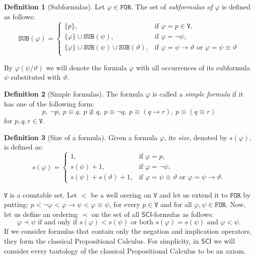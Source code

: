 \documentclass{article}
\theoremstyle{definition}
\newtheorem{definition}{Definition}[section]
\theoremstyle{definition}
\theoremstyle{definition}
\theoremstyle{definition}
\theoremstyle{definition}
\newcommand*{\id}{\equiv}
\newcommand*{\ra}{\rightarrow}
\newcommand*{\V}{\texttt{V}}
\newcommand*{\FOR}{\texttt{FOR}}
\newcommand*{\SUB}{\texttt{SUB}}
\newcommand{\SCI}{$\mathsf{SCI}$\xspace}
\begin{document}
\begin{definition}[Subformulas]
    Let $\varphi \in \FOR$. The set of \emph{subformulas of $\varphi$} is defined as follows:
    $$
        \SUB(\varphi) = \begin{cases}
            \{p\},                                            & \text{if } \varphi = p \in \V,                                                   \\
            \{\varphi\} \cup \SUB(\psi),                      & \text{if } \varphi = \lnot \psi,                                                 \\
            \{\varphi\} \cup \SUB(\psi) \cup \SUB(\vartheta), & \text{if } \varphi = \psi \ra \vartheta \text{ or } \varphi = \psi \id \vartheta \\
        \end{cases}
    $$
\end{definition}
By $\varphi(\psi / \vartheta)$ we will denote the formula $\varphi$ with all
occurrences of its subformula $\psi$ substituted with $\vartheta$.

\begin{definition}[Simple formulas]
    The formula $\varphi$ is called a \emph{simple formula} if it has one of the following form:
    $$
        p,\ \lnot p,\ p \id q,\ p \not \id q,\ p \id \lnot q,\ p \id (q \ra r),\ p \id (q \id r)
    $$
    for $p, q, r \in \V$.
\end{definition}

\begin{definition}[Size of a formula]
    Given a formula $\varphi$, its \emph{size}, denoted by $s(\varphi)$, is defined as:
    $$
        s(\varphi) = \begin{cases}
            1,                          & \text{if } \varphi = p,                                                                      \\
            s(\psi) + 1,                & \text{if } \varphi = \lnot \psi,                                                             \\
            s(\psi) + s(\vartheta) + 1, & \text{if } \varphi = \psi \equiv \vartheta \text{ or } \varphi = \psi \rightarrow \vartheta.
        \end{cases}
    $$
\end{definition}
$\V$ is a countable set. Let $<$ be a well orering on $\V$ and let us extend it to $\FOR$ by putting: $p < \lnot \varphi < \varphi \ra \psi < \varphi \id \psi$, for every $p \in \V$ and for all $\varphi, \psi \in \FOR$. Now,
let us define an ordering $\prec$ on the set of all \SCI-formulas as follows:
$$
    \varphi \prec \psi \text{ if and only if } s(\varphi) < s(\psi) \text{ or both } s(\varphi) = s(\psi) \text{ and }\varphi < \psi.
$$
If we consider formulas that contain only the negation and implication
operators, they form the classical Propositional Calculus. For simplicity, in
\SCI we will consider every tautology of the classical Propositional Calculus
to be an axiom.
\end{document}
